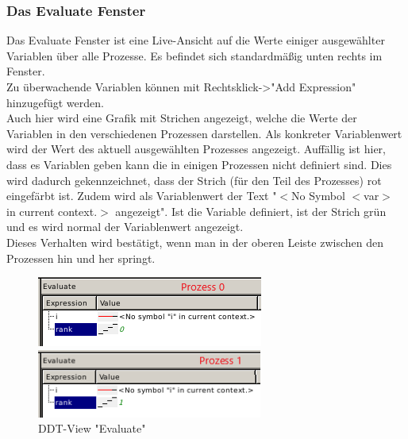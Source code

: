\documentclass[12pt]{article}
\begin{document}
\begin{sloppypar}
\subsubsection*{Das Evaluate Fenster}
Das Evaluate Fenster ist eine Live-Ansicht auf die Werte einiger ausgewählter Variablen über alle Prozesse. Es befindet sich standardmäßig unten rechts im Fenster. \\
Zu überwachende Variablen können mit Rechtsklick->"Add Expression" hinzugefügt werden. \\
Auch hier wird eine Grafik mit Strichen angezeigt, welche die Werte der Variablen in den verschiedenen Prozessen darstellen. Als konkreter Variablenwert wird der Wert des aktuell ausgewählten Prozesses angezeigt. Auffällig ist hier, dass es Variablen geben kann die in einigen Prozessen nicht definiert sind. Dies wird dadurch gekennzeichnet, dass der Strich (für den Teil des Prozesses) rot eingefärbt ist. Zudem wird als Variablenwert der Text "$<$No Symbol $<$var$>$ in current context.$>$ angezeigt". Ist die Variable definiert, ist der Strich grün und es wird normal der Variablenwert angezeigt. \\
Dieses Verhalten wird bestätigt, wenn man in der oberen Leiste zwischen den Prozessen hin und her springt.

\begin{figure}[htbp]
    \caption{DDT-View "Evaluate"}
    \begin{minipage}[t]{\textwidth}
        \begin{minipage}[t]{0.5\textwidth}
            \includegraphics[width=\textwidth]{res/ddt-evaluate-0.PNG}
        \end{minipage}
        \begin{minipage}[t]{0.5\textwidth}
            \includegraphics[width=\textwidth]{res/ddt-evaluate-1.PNG}
        \end{minipage}
    \end{minipage}


\end{figure}
\end{sloppypar}
\end{document}
